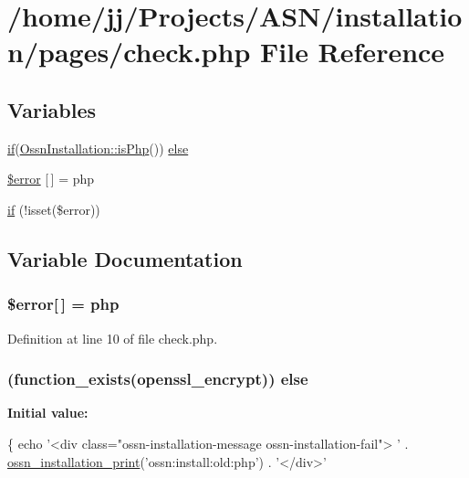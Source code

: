 \hypertarget{check_8php}{}\section{/home/jj/\+Projects/\+A\+S\+N/installation/pages/check.php File Reference}
\label{check_8php}
\subsection*{Variables}
\begin{DoxyCompactItemize}
\item 
\hyperlink{jquery_8tokeninput_8js_ad8dd46a3cbc004569e34401e9e71771a}{if}(\hyperlink{class_ossn_installation_a4c0d148a0a9e4e42d95daeb6c877e522}{Ossn\+Installation\+::is\+Php}()) \hyperlink{check_8php_ab3c369767394e626008f328c36b9aa24}{else}
\item 
\hyperlink{check_8php_a803638b69ff27d4d204c6dfd14ebad0b}{\$error} \mbox{[}$\,$\mbox{]} = \textquotesingle{}php\textquotesingle{}
\item 
\hyperlink{check_8php_a3440bc9905d032b4674c533ff27653e2}{if} (!isset(\$error))
\end{DoxyCompactItemize}


\subsection{Variable Documentation}
\subsubsection[{\texorpdfstring{\$error}{$error}}]{\setlength{\rightskip}{0pt plus 5cm}\$error\mbox{[}$\,$\mbox{]} = \textquotesingle{}php\textquotesingle{}}\hypertarget{check_8php_a803638b69ff27d4d204c6dfd14ebad0b}{}\label{check_8php_a803638b69ff27d4d204c6dfd14ebad0b}


Definition at line 10 of file check.\+php.

\subsubsection[{\texorpdfstring{else}{else}}]{ (function\+\_\+exists(\textquotesingle{}openssl\+\_\+encrypt\textquotesingle{})) else}\hypertarget{check_8php_ab3c369767394e626008f328c36b9aa24}{}\label{check_8php_ab3c369767394e626008f328c36b9aa24}
{\bfseries Initial value\+:}
\begin{DoxyCode}
\{
    echo \textcolor{stringliteral}{'<div class="ossn-installation-message ossn-installation-fail"> '} . 
      \hyperlink{ossn_8install_8php_a560b8c630618c02ac2dd8ecbe534b6b8}{ossn\_installation\_print}(\textcolor{stringliteral}{'ossn:install:old:php'}) . \textcolor{stringliteral}{'</div>'}
\end{DoxyCode}


